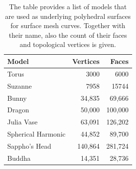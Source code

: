 \documentclass{stdlocal}
\begin{document}
\begin{table}[H]
  \caption{%
    The table provides a list of models that are used as underlying polyhedral surfaces for surface mesh curves.
    Together with their name, also the count of their faces and topological vertices is given.
  }
  \label{tab:results-models}
  \centering
  \small
  \renewcommand{\arraystretch}{1.3}
  \begin{tabular}{lrr}
    \hline
    \textbf{Model} & \textbf{Vertices} & \textbf{Faces} \\
    \hline
    \hline
    \rowcolor{mathdefback}
    Torus & 3000 & 6000 \\
    Suzanne & 7958 & 15744 \\
    \rowcolor{mathdefback}
    Bunny & 34,835 & 69,666 \\
    Dragon & 50,000 & 100,000 \\
    \rowcolor{mathdefback}
    Julia Vase & 63,091 & 126,202 \\
    Spherical Harmonic & 44,852 & 89,700 \\
    \rowcolor{mathdefback}
    Sappho's Head & 140,864 & 281,724 \\
    Buddha & 14,351 & 28,736 \\
    \hline
  \end{tabular}
\end{table}
\end{document}
